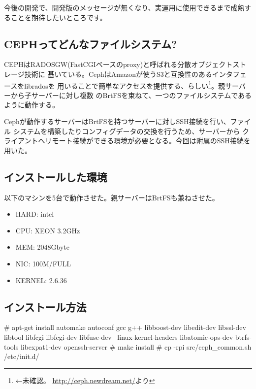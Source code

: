 \documentclass[mingoth,a4paper]{jsarticle}
\begin{document}
今後の開発で、開発版のメッセージが無くなり、実運用に使用できるまで成熟することを期待したいところです。



\subsection{CEPHってどんなファイルシステム?}
CEPHはRADOSGW(FastCGIベースのproxy)と呼ばれる分散オブジェクトストレージ技術に
基いている。CephはAmazonが使うS3と互換性のあるインタフェースをlibradosを
用いることで簡単なアクセスを提供する、らしい\footnote{←未確認。
\url{http://ceph.newdream.net/}より}。親サーバーから子サーバーに対し複数
のBrtFSを束ねて、一つのファイルシステムであるように動作する。

Cephが動作するサーバーはBrtFSを持つサーバーに対しSSH接続を行い、ファイル
システムを構築したりコンフィグデータの交換を行うため、サーバーから
クライアントへリモート接続ができる環境が必要となる。今回は附属のSSH接続を用いた。

\subsection{インストールした環境}
以下のマシンを5台で動作させた。親サーバーはBrtFSも兼ねさせた。
\begin{itemize}
 \item HARD: intel
 \item CPU: XEON 3.2GHz
 \item MEM: 2048Gbyte
 \item NIC: 100M/FULL
 \item KERNEL: 2.6.36
\end{itemize}

\subsection{インストール方法}

\begin{commandline}
# apt-get install automake autoconf gcc g++ libboost-dev libedit-dev libssl-dev libtool libfcgi libfcgi-dev libfuse-dev \
linux-kernel-headers libatomic-ops-dev btrfs-tools libexpat1-dev openssh-server
# make install
# cp -rpi src/ceph_common.sh /etc/init.d/
\end{commandline}
\end{document}
